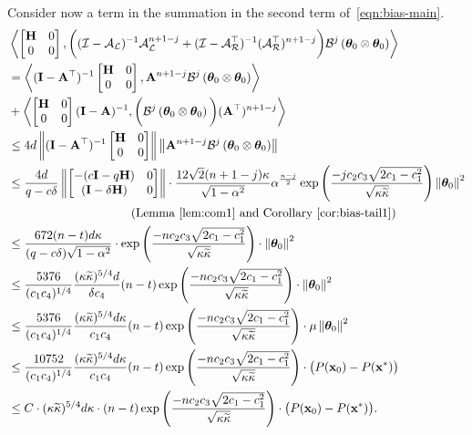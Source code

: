 	Consider now a term in the summation in the second term of~\eqref{eqn:bias-main}.
	\begin{align}
		&\iprod{\begin{bmatrix}
			\Cov & \zero \\ \zero & \zero
			\end{bmatrix} }{\bigg( (\eyeT-\AL)^{-1}\AL^{n+1-j} + (\eyeT-\AR\T)^{-1}(\AR\T)^{n+1-j} \bigg)\BT^j \left({\thetat[0] \otimes \thetat[0]}\right)}  \nonumber \\
		&= \iprod{(\eye-\A\T)^{-1}\begin{bmatrix}
			\Cov & \zero \\ \zero & \zero
			\end{bmatrix} }{\A^{n+1-j} \BT^j \left({\thetat[0] \otimes \thetat[0]}\right)} \nonumber\\&+ \iprod{\begin{bmatrix}
			\Cov & \zero \\ \zero & \zero
			\end{bmatrix} (\eye-\A)^{-1}}{\bigg(\BT^j \left({\thetat[0] \otimes \thetat[0]}\right)\bigg) (\A\T)^{n+1-j} } \nonumber \\
		&\leq 4 d \norm{(\eye-\A\T)^{-1}\begin{bmatrix}
			\Cov & \zero \\ \zero & \zero
			\end{bmatrix} } \norm{\A^{n+1-j} \BT^j \left({\thetat[0] \otimes \thetat[0]}\right)} \nonumber \\
		&\leq \frac{4d}{\g-c\delta} \norm{\begin{bmatrix}-(c\eye-\g\Cov)&0\\(\eye-\delta\Cov)&0\end{bmatrix}} \cdot \frac{12\sqrt{2}(n+1-j)\cnH}{\sqrt{1-\alpha^2}} \alpha^{\frac{n-j}{2}} \exp\left(\frac{-j \ctwo \cthree \sqrt{2\cone-\cone^2} }{\sqrt{\cnH\cnS}}\right) \norm{\thetat[0]}^2  \nonumber \\ & \qquad \qquad \qquad \qquad \qquad \left(\mbox{Lemma~\ref{lem:com1} and Corollary~\ref{cor:bias-tail1}}\right) \nonumber \\
		&\leq \frac{672 (n-t) d \cnH}{(\g - c\delta)\sqrt{1-\alpha^2}} \cdot \exp\left(\frac{-n \ctwo \cthree \sqrt{2\cone-\cone^2} }{\sqrt{\cnH\cnS}}\right) \cdot \norm{\thetat[0]}^2\nonumber\\
		&\leq\frac{5376}{(\cone\cfour)^{1/4}}\frac{(\cnH\cnS)^{5/4}d}{\delta\cfour}(n-t)\exp\left(\frac{-n \ctwo \cthree \sqrt{2\cone-\cone^2} }{\sqrt{\cnH\cnS}}\right) \cdot \norm{\thetat[0]}^2\nonumber\\		
		&\leq\frac{5376}{(\cone\cfour)^{1/4}}\frac{(\cnH\cnS)^{5/4}d\cnH}{\cone\cfour}(n-t)\exp\left(\frac{-n \ctwo \cthree \sqrt{2\cone-\cone^2} }{\sqrt{\cnH\cnS}}\right) \cdot \mu\norm{\thetat[0]}^2\nonumber\\		
		&\leq\frac{10752}{(\cone\cfour)^{1/4}}\frac{(\cnH\cnS)^{5/4}d\cnH}{\cone\cfour}(n-t)\exp\left(\frac{-n \ctwo \cthree \sqrt{2\cone-\cone^2} }{\sqrt{\cnH\cnS}}\right) \cdot \big(P(\x_0)-P(\xs)\big)\nonumber\\		
		&\leq\UC\cdot(\cnH\cnS)^{5/4}d\cnH\cdot(n-t)\exp\left(\frac{-n \ctwo \cthree \sqrt{2\cone-\cone^2} }{\sqrt{\cnH\cnS}}\right) \cdot \big(P(\x_0)-P(\xs)\big).\label{eqn:bias-2}
	\end{align}
